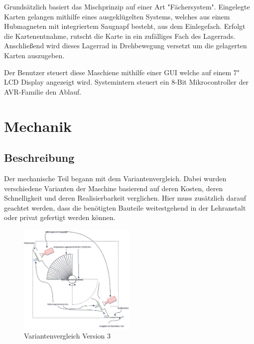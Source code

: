 Grundsätzlich basiert das Mischprinzip auf einer Art "Fächersystem".
Eingelegte Karten gelangen mithilfe eines ausgeklügelten Systems, welches aus einem Hubmagneten mit integriertem Saugnapf besteht, aus dem Einlegefach.
Erfolgt die Kartenentnahme, rutscht die Karte in ein zufälliges Fach des Lagerrads. Anschließend wird dieses Lagerrad in Drehbewegung versetzt um die gelagerten Karten auszugeben.

Der Benutzer steuert diese Maschiene mithilfe einer GUI welche auf einem 7" LCD Display angezeigt wird. Systemintern steuert ein 8-Bit Mikrocontroller der AVR-Familie den Ablauf.

\chapter{Mechanik}
\label{sec:Mechanik}
\section{Beschreibung}

Der mechanische Teil begann mit dem Variantenvergleich. Dabei wurden verschiedene Varianten der Maschine basierend auf deren Kosten, deren Schnelligkeit und deren Realisierbarkeit verglichen.
Hier muss zusätzlich darauf geachtet werden, dass die benötigten Bauteile weitestgehend in der Lehranstalt oder privat gefertigt werden können.\\

\begin{figure}
    \vspace{-50pt}
    \begin{center}
        \includegraphics[width=0.5\textwidth]{fig/Reshuffled_Version_3_0_prinzip}
    \end{center}
    \caption{Variantenvergleich Version 3}
    \label{Variantenvergleich}
    \vspace{0pt}
\end{figure}

